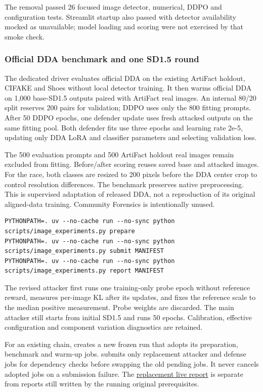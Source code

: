 The removal passed 26 focused image detector, numerical, DDPO and
configuration tests. Streamlit startup also passed with detector
availability mocked as unavailable; model loading and scoring were not
exercised by that smoke check.

\subsubsection{Official DDA benchmark and one SD1.5
round}\label{record-docs-research-guide-md-official-dda-benchmark-and-one-sd1.5-round}

The dedicated driver evaluates official DDA on the existing ArtiFact
holdout, CIFAKE and Shoes without local detector training. It then warms
official DDA on 1,000 base-SD1.5 outputs paired with ArtiFact real
images. An internal 80/20 split reserves 200 pairs for validation; DDPO
uses only the 800 fitting prompts. After 50 DDPO epochs, one defender
update uses fresh attacked outputs on the same fitting pool. Both
defender fits use three epochs and learning rate 2e-5, updating only DDA
LoRA and classifier parameters and selecting validation loss.

The 500 evaluation prompts and 500 ArtiFact holdout real images remain
excluded from fitting. Before/after scoring reuses saved base and
attacked images. For the race, both classes are resized to 200 pixels
before the DDA center crop to control resolution differences. The
benchmark preserves native preprocessing. This is supervised adaptation
of released DDA, not a reproduction of its original aligned-data
training. Community Forensics is intentionally unused.

\begin{Verbatim}
PYTHONPATH=. uv --no-cache run --no-sync python scripts/image_experiments.py prepare
PYTHONPATH=. uv --no-cache run --no-sync python scripts/image_experiments.py submit MANIFEST
PYTHONPATH=. uv --no-cache run --no-sync python scripts/image_experiments.py report MANIFEST
\end{Verbatim}

The revised attacker first runs one training-only probe epoch without
reference reward, measures per-image KL after its updates, and fixes the
reference scale to the median positive measurement. Probe weights are
discarded. The main attacker still starts from initial SD1.5 and runs 50
epochs. Calibration, effective configuration and component variation
diagnostics are retained.

For an existing chain,
\texttt{} creates a new
frozen run that adopts its preparation, benchmark and warm-up jobs.
\texttt{} submits only replacement
attacker and defense jobs for dependency checks before swapping the old
pending jobs. It never cancels adopted jobs on a submission failure. The
\href{records/docs/image_reference_reward_results.tex}{replacement live
report} is separate from reports still written by the running original
prerequisites.

